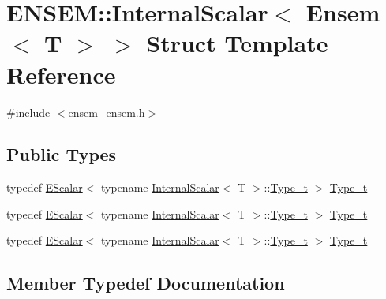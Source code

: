 \hypertarget{structENSEM_1_1InternalScalar_3_01Ensem_3_01T_01_4_01_4}{}\section{E\+N\+S\+EM\+:\+:Internal\+Scalar$<$ Ensem$<$ T $>$ $>$ Struct Template Reference}
\label{structENSEM_1_1InternalScalar_3_01Ensem_3_01T_01_4_01_4}


{\ttfamily \#include $<$ensem\+\_\+ensem.\+h$>$}

\subsection*{Public Types}
\begin{DoxyCompactItemize}
\item 
typedef \mbox{\hyperlink{classENSEM_1_1EScalar}{E\+Scalar}}$<$ typename \mbox{\hyperlink{structENSEM_1_1InternalScalar}{Internal\+Scalar}}$<$ T $>$\+::\mbox{\hyperlink{structENSEM_1_1InternalScalar_3_01Ensem_3_01T_01_4_01_4_ab389a1f835bfbbf4a47aefe1c076d832}{Type\+\_\+t}} $>$ \mbox{\hyperlink{structENSEM_1_1InternalScalar_3_01Ensem_3_01T_01_4_01_4_ab389a1f835bfbbf4a47aefe1c076d832}{Type\+\_\+t}}
\item 
typedef \mbox{\hyperlink{classENSEM_1_1EScalar}{E\+Scalar}}$<$ typename \mbox{\hyperlink{structENSEM_1_1InternalScalar}{Internal\+Scalar}}$<$ T $>$\+::\mbox{\hyperlink{structENSEM_1_1InternalScalar_3_01Ensem_3_01T_01_4_01_4_ab389a1f835bfbbf4a47aefe1c076d832}{Type\+\_\+t}} $>$ \mbox{\hyperlink{structENSEM_1_1InternalScalar_3_01Ensem_3_01T_01_4_01_4_ab389a1f835bfbbf4a47aefe1c076d832}{Type\+\_\+t}}
\item 
typedef \mbox{\hyperlink{classENSEM_1_1EScalar}{E\+Scalar}}$<$ typename \mbox{\hyperlink{structENSEM_1_1InternalScalar}{Internal\+Scalar}}$<$ T $>$\+::\mbox{\hyperlink{structENSEM_1_1InternalScalar_3_01Ensem_3_01T_01_4_01_4_ab389a1f835bfbbf4a47aefe1c076d832}{Type\+\_\+t}} $>$ \mbox{\hyperlink{structENSEM_1_1InternalScalar_3_01Ensem_3_01T_01_4_01_4_ab389a1f835bfbbf4a47aefe1c076d832}{Type\+\_\+t}}
\end{DoxyCompactItemize}


\subsection{Member Typedef Documentation}
\mbox{\label{structENSEM_1_1InternalScalar_3_01Ensem_3_01T_01_4_01_4_ab389a1f835bfbbf4a47aefe1c076d832}} 
